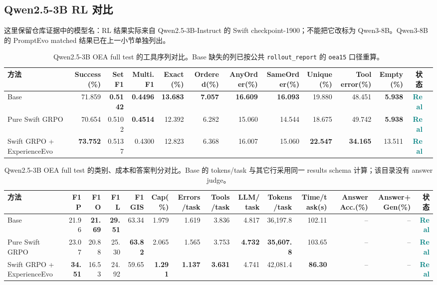 \documentclass[a4paper,11pt]{article}
\newcommand{\real}{\textcolor{teal}{\textbf{Real}}}
\begin{document}
\begin{CJK*}{UTF8}{gbsn}
\section{Qwen2.5-3B RL 对比}

这里保留仓库证据中的模型名：RL 结果实际来自 Qwen2.5-3B-Instruct 的 Swift checkpoint-1900；不能把它改标为 Qwen3-8B。Qwen3-8B 的 PromptEvo matched 结果已在上一小节单独列出。

\begin{table}[H]
\centering\scriptsize
\caption{Qwen2.5-3B OEA full test 的工具序列对比。Base 缺失的列已按公共 \texttt{rollout\_report} 的 \texttt{oea15} 口径重算。}
\begin{adjustbox}{max width=\textwidth}
\begin{tabular}{lrrrrrrrrrrrr}
\toprule
方法 & Success(\%) & Set F1 & Multi. F1 & Exact(\%) & Ordered(\%) & AnyOrder(\%) & SameOrder(\%) & Unique(\%) & Tool error(\%) & Empty(\%) & 状态\\
\midrule
Base & 71.859 & \textbf{0.5142} & \textbf{0.4496} & \textbf{13.683} & \textbf{7.057} & \textbf{16.609} & \textbf{16.093} & 19.880 & 48.451 & \textbf{5.938} & \real\\
Pure Swift GRPO & 70.654 & 0.5102 & \textbf{0.4514} & 12.392 & 6.282 & 15.060 & 14.544 & 18.675 & 49.742 & \textbf{5.938} & \real\\
Swift GRPO + ExperienceEvo & \textbf{73.752} & 0.5137 & 0.4300 & 12.823 & 6.368 & 16.007 & 15.060 & \textbf{22.547} & \textbf{34.165} & 13.511 & \real\\
\bottomrule
\end{tabular}
\end{adjustbox}
\end{table}

\begin{table}[H]
\centering\scriptsize
\caption{Qwen2.5-3B OEA full test 的类别、成本和答案判分对比。Base 的 tokens/task 与其它行采用同一 results schema 计算；该目录没有 answer judge。}
\begin{adjustbox}{max width=\textwidth}
\begin{tabular}{lrrrrrrrrrrrrr}
\toprule
方法 & F1 P & F1 O & F1 L & F1 GIS & Cap(\%) & Errors/task & Tools/task & LLM/task & Tokens/task & Time/task(s) & Answer Acc.(\%) & Answer+Gen(\%) & 状态\\
\midrule
Base & 21.96 & \textbf{21.69} & \textbf{29.51} & 63.34 & 1.979 & 1.619 & 3.836 & 4.817 & 36,197.8 & 102.11 & -- & -- & \real\\
Pure Swift GRPO & 23.07 & 20.88 & 25.30 & \textbf{63.82} & 2.065 & 1.565 & 3.753 & \textbf{4.732} & \textbf{35,607.8} & 103.65 & -- & -- & \real\\
Swift GRPO + ExperienceEvo & \textbf{34.51} & 16.53 & 24.92 & 59.65 & \textbf{1.291} & \textbf{1.137} & \textbf{3.631} & 4.741 & 42,081.4 & \textbf{86.30} & -- & -- & \real\\
\bottomrule
\end{tabular}
\end{adjustbox}
\end{table}


\end{CJK*}
\end{document}
